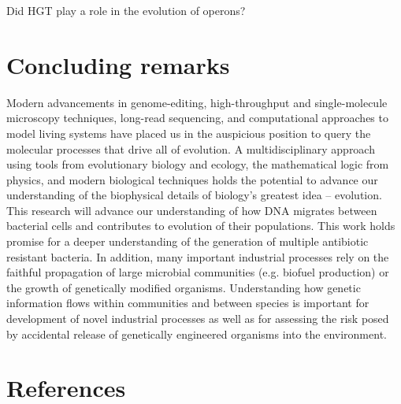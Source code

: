 Did HGT play a role in the evolution of operons?


\section*{Concluding remarks}

Modern advancements in genome-editing, high-throughput and single-molecule
microscopy techniques, long-read sequencing, and computational approaches to
model living systems have placed us in the auspicious position to query the
molecular processes that drive all of evolution. A multidisciplinary approach
using tools from evolutionary biology and ecology, the mathematical logic from
physics, and modern biological techniques holds the potential to advance our
understanding of the biophysical details of biology's greatest idea --
evolution. This research will advance our understanding of how DNA migrates
between bacterial cells and contributes to evolution of their populations. This
work holds promise for a deeper understanding of the generation of multiple
antibiotic resistant bacteria. In addition, many important industrial processes
rely on the faithful propagation of large microbial communities (e.g. biofuel
production) or the growth of genetically modified organisms. Understanding how
genetic information flows within communities and between species is important
for development of novel industrial processes as well as for assessing the risk
posed by accidental release of genetically engineered organisms into the
environment. 


\section*{References}



